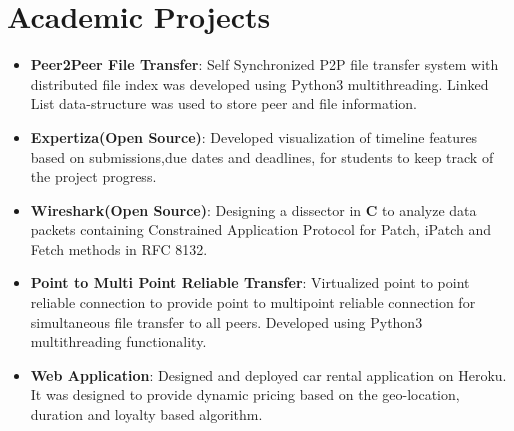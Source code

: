 \documentclass[letterpaper,11pt]{article}
\newcommand{\resumeItem}[2]{
  \item\small{
    \textbf{#1}{: #2 \vspace{-2pt}}
  }
}
\newcommand{\resumeSubItem}[2]{\resumeItem{#1}{#2}\vspace{-4pt}}
\newcommand{\resumeSubHeadingListStart}{\begin{itemize}[leftmargin=*]}
\newcommand{\resumeSubHeadingListEnd}{\end{itemize}}
\begin{document}
\section{Academic Projects}
  \resumeSubHeadingListStart
    \resumeSubItem{Peer2Peer File Transfer}
      {Self Synchronized P2P file transfer system with distributed file index was developed using Python3 multithreading. Linked List data-structure was used to store peer and file information.}
    \resumeSubItem{Expertiza(Open Source)}
      {Developed visualization of timeline features based on submissions,due dates and deadlines, for students to keep track of the project progress.} %
    \resumeSubItem{Wireshark(Open Source)}
      {Designing a dissector in \textbf{C} to analyze data packets containing Constrained Application Protocol for Patch, iPatch and Fetch methods in RFC 8132.}
    \resumeSubItem{Point to Multi Point Reliable Transfer}
      {Virtualized point to point reliable connection to provide point to multipoint reliable connection for simultaneous file transfer to all peers. Developed using Python3 multithreading functionality.}
    \resumeSubItem{Web Application}
      {Designed and deployed car rental application on Heroku. It was designed to provide dynamic pricing based on the geo-location, duration and loyalty based algorithm.}
  \resumeSubHeadingListEnd


\end{document}
